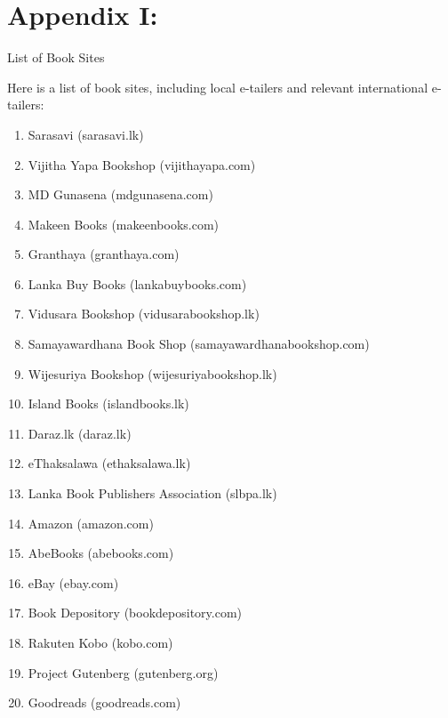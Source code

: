 \section*{Appendix I:}{List of Book Sites}\label{sec:appendixI}

Here is a list of book sites, including local e-tailers and relevant international e-tailers:

\begin{enumerate}
    \item Sarasavi (sarasavi.lk)
    \item Vijitha Yapa Bookshop (vijithayapa.com)
    \item MD Gunasena (mdgunasena.com)
    \item Makeen Books (makeenbooks.com)
    \item Granthaya (granthaya.com)
    \item Lanka Buy Books (lankabuybooks.com)
    \item Vidusara Bookshop (vidusarabookshop.lk)
    \item Samayawardhana Book Shop (samayawardhanabookshop.com)
    \item Wijesuriya Bookshop (wijesuriyabookshop.lk)
    \item Island Books (islandbooks.lk)
    \item Daraz.lk (daraz.lk)
    \item eThaksalawa (ethaksalawa.lk)
    \item Lanka Book Publishers Association (slbpa.lk)
    \item Amazon (amazon.com)
    \item AbeBooks (abebooks.com)
    \item eBay (ebay.com)
    \item Book Depository (bookdepository.com)
    \item Rakuten Kobo (kobo.com)
    \item Project Gutenberg (gutenberg.org)
    \item Goodreads (goodreads.com)
\end{enumerate}